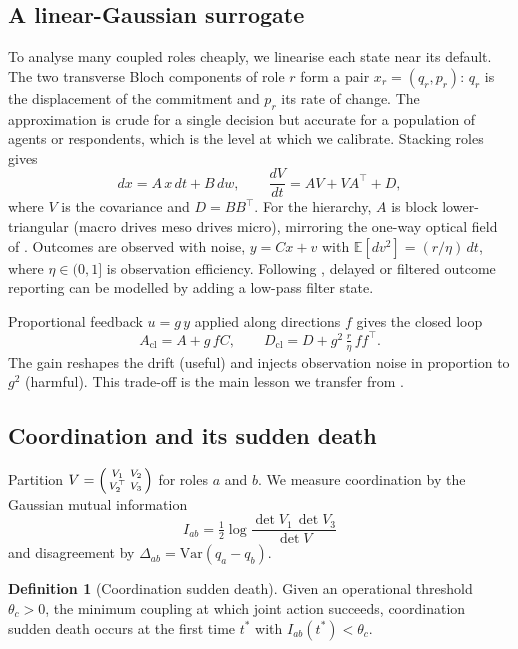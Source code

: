 \documentclass[11pt]{article}
\theoremstyle{definition}
\newtheorem{definition}{Definition}
\theoremstyle{remark}
\begin{document}
\subsection{A linear-Gaussian surrogate}
To analyse many coupled roles cheaply, we linearise each state near its default. The two transverse Bloch components of role $r$ form a pair $x_r=(q_r,p_r)$: $q_r$ is the displacement of the commitment and $p_r$ its rate of change. The approximation is crude for a single decision but accurate for a population of agents or respondents, which is the level at which we calibrate. Stacking roles gives
\begin{equation}
dx=A\,x\,dt+B\,dw,\qquad \frac{dV}{dt}=AV+VA^\top+D,
\label{eq:lyap}
\end{equation}
where $V$ is the covariance and $D=BB^\top$. For the hierarchy, $A$ is block lower-triangular (macro drives meso drives micro), mirroring the one-way optical field of \citet{yamamoto2008pra}. Outcomes are observed with noise, $y=Cx+v$ with $\mathbb{E}[dv^2]=(r/\eta)\,dt$, where $\eta\in(0,1]$ is observation efficiency. Following \citet{yamamoto2008pra}, delayed or filtered outcome reporting can be modelled by adding a low-pass filter state.

Proportional feedback $u=g\,y$ applied along directions $f$ gives the closed loop
\begin{equation}
A_{\mathrm{cl}}=A+g\,fC,\qquad D_{\mathrm{cl}}=D+g^2\,\tfrac{r}{\eta}\,ff^\top .
\label{eq:closed}
\end{equation}
The gain reshapes the drift (useful) and injects observation noise in proportion to $g^2$ (harmful). This trade-off is the main lesson we transfer from \citet{yamamoto2008cdc,yamamoto2008pra}.

\subsection{Coordination and its sudden death}
Partition $V=\begin{psmallmatrix}V_1&V_2\\V_2^\top&V_3\end{psmallmatrix}$ for roles $a$ and $b$. We measure coordination by the Gaussian mutual information
\begin{equation}
I_{ab}=\tfrac12\log\frac{\det V_1\,\det V_3}{\det V}
\label{eq:mi}
\end{equation}
and disagreement by $\Delta_{ab}=\mathrm{Var}(q_a-q_b)$.

\begin{definition}[Coordination sudden death]
\label{def:csd}
Given an operational threshold $\theta_c>0$, the minimum coupling at which joint action succeeds, coordination sudden death occurs at the first time $t^\ast$ with $I_{ab}(t^\ast)<\theta_c$.
\end{definition}
\end{document}
